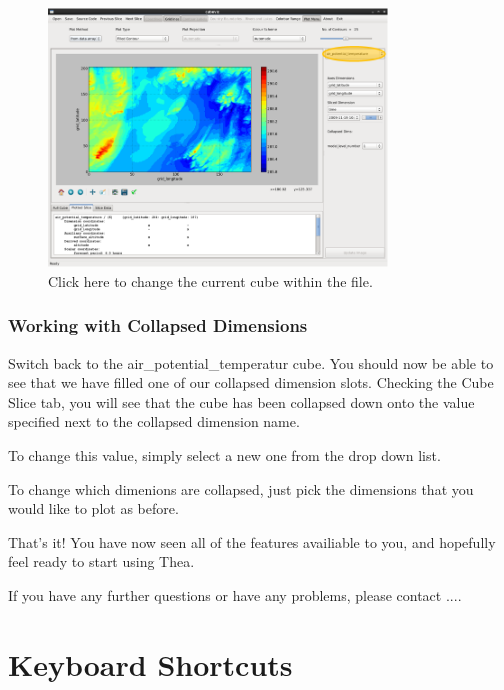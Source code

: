 \documentclass[a4paper,12pt]{article}
\begin{document}
\begin{figure}[H]
\centering
\includegraphics[width=90mm]{resources/tute16.PNG}
\caption{Click here to change the current cube within the file.}
\label{overflow}
\end{figure}

\subsubsection{Working with Collapsed Dimensions}

Switch back to the air\_potential\_temperatur cube. You should now be able to
see that we have filled one of our collapsed dimension
slots. Checking the Cube Slice tab, you will see that the cube has been
collapsed down onto the value specified next to the collapsed dimension name.

To change this value, simply select a new one from the drop down list.

To change which dimenions are collapsed, just pick the dimensions that you
would like to plot as before.

\vspace{4mm}

That's it! You have now seen all of the features availiable to you, and
hopefully feel ready to start using Thea.

If you have any further questions or have any problems, please contact $....$

\pagebreak

\section{Keyboard Shortcuts}
\end{document}
